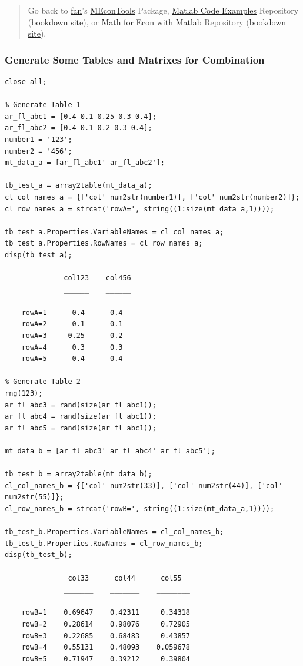 \documentclass[
]{book}
\begin{document}
\begin{quote}
Go back to \href{http://fanwangecon.github.io/}{fan}'s \href{https://fanwangecon.github.io/MEconTools/}{MEconTools} Package, \href{https://fanwangecon.github.io/M4Econ/}{Matlab Code Examples} Repository (\href{https://fanwangecon.github.io/M4Econ/bookdown}{bookdown site}), or \href{https://fanwangecon.github.io/Math4Econ/}{Math for Econ with Matlab} Repository (\href{https://fanwangecon.github.io/Math4Econ/bookdown}{bookdown site}).
\end{quote}

\hypertarget{generate-some-tables-and-matrixes-for-combination}{%
\subsubsection{Generate Some Tables and Matrixes for Combination}\label{generate-some-tables-and-matrixes-for-combination}}

\begin{verbatim}
close all;

% Generate Table 1
ar_fl_abc1 = [0.4 0.1 0.25 0.3 0.4];
ar_fl_abc2 = [0.4 0.1 0.2 0.3 0.4];
number1 = '123';
number2 = '456';
mt_data_a = [ar_fl_abc1' ar_fl_abc2'];

tb_test_a = array2table(mt_data_a);
cl_col_names_a = {['col' num2str(number1)], ['col' num2str(number2)]};
cl_row_names_a = strcat('rowA=', string((1:size(mt_data_a,1))));

tb_test_a.Properties.VariableNames = cl_col_names_a;
tb_test_a.Properties.RowNames = cl_row_names_a;
disp(tb_test_a);

              col123    col456
              ______    ______

    rowA=1      0.4      0.4  
    rowA=2      0.1      0.1  
    rowA=3     0.25      0.2  
    rowA=4      0.3      0.3  
    rowA=5      0.4      0.4  

% Generate Table 2
rng(123);
ar_fl_abc3 = rand(size(ar_fl_abc1));
ar_fl_abc4 = rand(size(ar_fl_abc1));
ar_fl_abc5 = rand(size(ar_fl_abc1));

mt_data_b = [ar_fl_abc3' ar_fl_abc4' ar_fl_abc5'];

tb_test_b = array2table(mt_data_b);
cl_col_names_b = {['col' num2str(33)], ['col' num2str(44)], ['col' num2str(55)]};
cl_row_names_b = strcat('rowB=', string((1:size(mt_data_a,1))));

tb_test_b.Properties.VariableNames = cl_col_names_b;
tb_test_b.Properties.RowNames = cl_row_names_b;
disp(tb_test_b);

               col33      col44      col55  
              _______    _______    ________

    rowB=1    0.69647    0.42311     0.34318
    rowB=2    0.28614    0.98076     0.72905
    rowB=3    0.22685    0.68483     0.43857
    rowB=4    0.55131    0.48093    0.059678
    rowB=5    0.71947    0.39212     0.39804
\end{verbatim}
\end{document}

